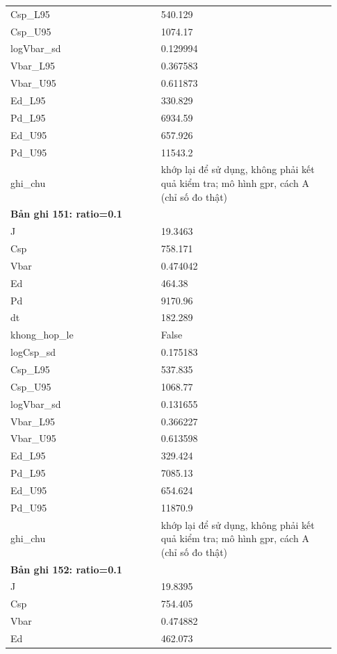 \begin{longtable}{p{0.43\linewidth}p{0.50\linewidth}}
Csp\_\allowbreak L95 & 540.129 \\
Csp\_\allowbreak U95 & 1074.17 \\
logVbar\_\allowbreak sd & 0.129994 \\
Vbar\_\allowbreak L95 & 0.367583 \\
Vbar\_\allowbreak U95 & 0.611873 \\
Ed\_\allowbreak L95 & 330.829 \\
Pd\_\allowbreak L95 & 6934.59 \\
Ed\_\allowbreak U95 & 657.926 \\
Pd\_\allowbreak U95 & 11543.2 \\
ghi\_\allowbreak chu & khớp lại để sử dụng, không phải kết quả kiểm tra; mô hình gpr, cách A (chỉ số đo thật) \\
\midrule
\multicolumn{2}{p{0.95\linewidth}}{\textbf{Bản ghi 151: ratio=0.1}} \\
J & 19.3463 \\
Csp & 758.171 \\
Vbar & 0.474042 \\
Ed & 464.38 \\
Pd & 9170.96 \\
dt & 182.289 \\
khong\_\allowbreak hop\_\allowbreak le & False \\
logCsp\_\allowbreak sd & 0.175183 \\
Csp\_\allowbreak L95 & 537.835 \\
Csp\_\allowbreak U95 & 1068.77 \\
logVbar\_\allowbreak sd & 0.131655 \\
Vbar\_\allowbreak L95 & 0.366227 \\
Vbar\_\allowbreak U95 & 0.613598 \\
Ed\_\allowbreak L95 & 329.424 \\
Pd\_\allowbreak L95 & 7085.13 \\
Ed\_\allowbreak U95 & 654.624 \\
Pd\_\allowbreak U95 & 11870.9 \\
ghi\_\allowbreak chu & khớp lại để sử dụng, không phải kết quả kiểm tra; mô hình gpr, cách A (chỉ số đo thật) \\
\midrule
\multicolumn{2}{p{0.95\linewidth}}{\textbf{Bản ghi 152: ratio=0.1}} \\
J & 19.8395 \\
Csp & 754.405 \\
Vbar & 0.474882 \\
Ed & 462.073 \\

\end{longtable}
